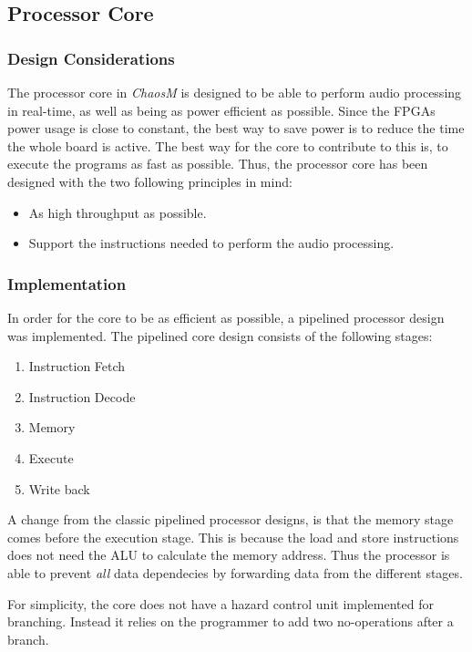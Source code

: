 \FloatBarrier
\subsection{Processor Core}\label{subsec:fpga-processor-core}

\subsubsection{Design Considerations}

The processor core in \textit{ChaosM} is designed to be able to perform audio processing in real-time, as well as being as power efficient as possible.
Since the FPGAs power usage is close to constant, the best way to save power is to reduce the time the whole board is active.
The best way for the core to contribute to this is, to execute the programs as fast as possible.
Thus, the processor core has been designed with the two following principles in mind:

\begin{itemize}
	\item As high throughput as possible.
	\item Support the instructions needed to perform the audio processing.
\end{itemize}

\subsubsection{Implementation}

In order for the core to be as efficient as possible, a pipelined processor
design was implemented. The pipelined core design consists of the following
stages:

\begin{enumerate}
	\item Instruction Fetch \label{stage:if}
	\item Instruction Decode \label{stage:id}
	\item Memory \label{stage:mem}
	\item Execute \label{stage:ex}
	\item Write back \label{stage:wb}
\end{enumerate}

A change from the classic pipelined processor designs, is that the memory stage comes before the execution stage.
This is because the load and store instructions does not need the ALU to calculate the memory address.
Thus the processor is able to prevent \textit{all} data dependecies by forwarding data from the different stages.

For simplicity, the core does not have a hazard control unit implemented for branching.
Instead it relies on the programmer to add two no-operations after a branch.


